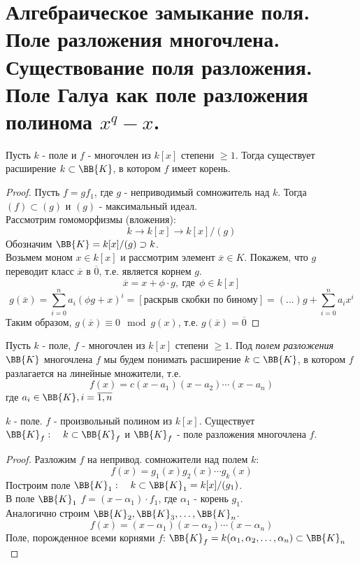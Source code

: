 \section{Алгебраическое замыкание поля. Поле разложения многочлена. Существование поля разложения. Поле Галуа
как поле разложения полинома $x^q-x$.}

\begin{thm}
Пусть $k$ - поле и $f$ - многочлен из $k[x]$ степени $\geqslant 1$. Тогда существует расширение $k \subset \BB{K}$, в котором
$f$ имеет корень.
\end{thm}
\begin{proof}
Пусть $f = gf_1$, где $g$ - неприводимый сомножитель над $k$. Тогда $(f) \subset (g)$ и $(g)$ - максимальный идеал.\\
Рассмотрим гомоморфизмы (вложения):
\[k \rightarrow k[x] \rightarrow k[x]/(g) \]
Обозначим $\BB{K} = k[x]/(g) \supset k$. \\
Возьмем моном $x \in k[x]$ и рассмотрим элемент $\overline{x} \in K$.
Покажем, что $g$ переводит класс $\overline{x}$ в $\overline{0}$, т.е. является корнем $g$.
\[\overline{x} = x + \phi \cdot g,~\text{где}~~\phi \in k[x]\]
\[g(\overline{x}) = \underset{i = 0}{\overset{n}\sum}a_i(\phi g + x)^i = [\text{раскрыв скобки по биному}] = (...)g + \underset{i = 0}{\overset{n}\sum}a_i x^i\]
Таким образом, $g(\overline{x}) \equiv 0 \mod g(x)$, т.е. $g(\overline{x}) = \overline{0}$
\end{proof}

Пусть $k$ - поле, $f$ - многочлен из $k[x]$ степени $\geqslant 1$. Под \emph{полем разложения} $\BB{K}$ многочлена $f$ мы
будем понимать расширение $k \subset \BB{K}$, в котором $f$ разлагается на линейные множители, т.е.
\[f(x) = c(x-a_1)(x-a_2)\cdots(x-a_n)\]
где $a_i \in \BB{K}, i = \overline{1,n}$

\begin{thm}
$k$ - поле. $f$ - произвольный полином из $k[x]$.
Существует $\BB{K}_f:~~~k \subset \BB{K}_f$ и $\BB{K}_f$ - поле разложения многочлена $f$.
\end{thm}
\begin{proof}
Разложим $f$ на непривод. сомножители над полем $k$:
\[f(x) = g_1(x)g_2(x) \cdots g_k(x)\]
Построим поле $\BB{K}_1:~~~k \subset \BB{K}_1 = k[x] / (g_1)$.\\
В поле $\BB{K}_1$  $f = (x - \alpha_1) \cdot f_1$, где $\alpha_1$ - корень $g_1$. \\
Аналогично строим $\BB{K}_2, \BB{K}_3, \dots, \BB{K}_n$.
\[f(x) = (x - \alpha_1)(x - \alpha_2) \cdots (x - \alpha_n)\]
Поле, порожденное всеми корнями $f$: $\BB{K}_f = k(\alpha_1, \alpha_2, \dots, \alpha_n) \subset \BB{K}_n$
\end{proof}


